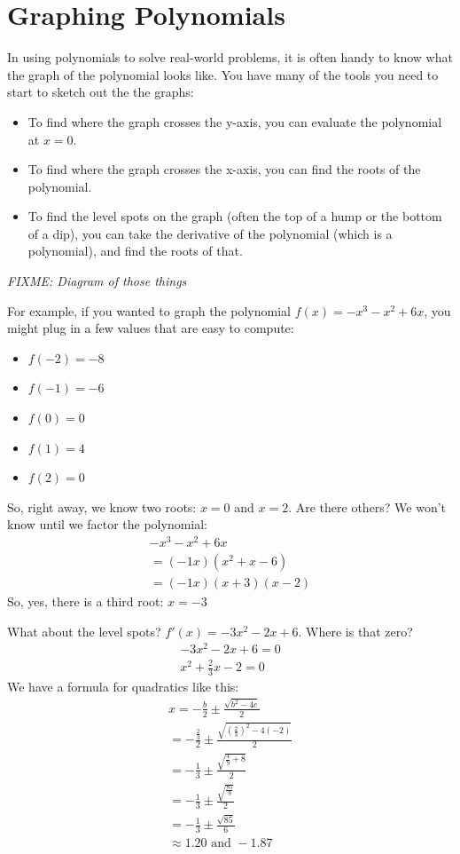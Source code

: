 \chapter{Graphing Polynomials}

In using polynomials to solve real-world problems, it is often handy
to know what the graph of the polynomial looks like. You have many of
the tools you need to start to sketch out the the graphs:
\begin{itemize}
\item To find where the graph crosses the y-axis, you can evaluate the polynomial at $x = 0$.
\item To find where the graph crosses the x-axis, you can find the roots of the polynomial.
\item To find the level spots on the graph (often the top of a hump or the bottom of a dip), you can take the derivative of the polynomial (which is a polynomial), and find the roots of that.
\end{itemize}

\textit{FIXME: Diagram of those things}

For example, if you wanted to graph the polynomial $f(x) = -x^3 -x^2 +
6x$, you might plug in a few values that are easy to compute:
\begin{itemize}
\item $f(-2) = -8$
\item $f(-1) = -6$
\item $f(0) = 0$
\item $f(1) = 4$
\item $f(2) = 0$ 
\end{itemize}

So, right away, we know two roots: $x = 0$ and $x = 2$. Are there
others? We won't know until we factor the polynomial:
\begin{multline*}
  -x^3 -x^2 + 6x \\
  = (-1x)(x^2 + x - 6) \\
  = (-1x)(x + 3)(x - 2)
\end{multline*}
So, yes, there is a third root: $x = -3$

What about the level spots? $f'(x) = -3x^2 - 2x + 6$. Where is that zero?
\begin{multline*}
  -3x^2 -2x + 6 = 0 \\
  x^2 + \frac{2}{3}x - 2 = 0
\end{multline*}
We have a formula for quadratics like this:
\begin{multline*}
  x = -\frac{b}{2} \pm \frac{\sqrt{b^2 - 4c}}{2} \\
  = -\frac{\frac{2}{3}}{2} \pm \frac{\sqrt{\left(\frac{2}{3}\right)^2 - 4(-2)}}{2} \\
  = -\frac{1}{3} \pm \frac{\sqrt{\frac{4}{9} + 8}}{2} \\
  = -\frac{1}{3} \pm \frac{\sqrt{\frac{85}{9}}}{2} \\
  = -\frac{1}{3} \pm \frac{\sqrt{85}}{6} \\
  \approx 1.20 \text{ and } -1.87 
\end{multline*}

